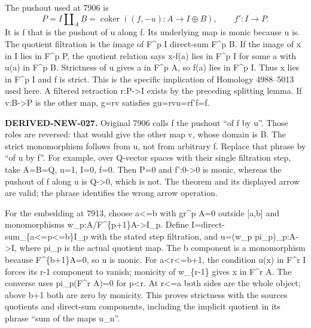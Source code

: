 The pushout used at 7906 is \[
 P=I\amalg_A B
   =\operatorname{coker}((f,-u):A\to I\oplus B),\qquad
 f':I\longrightarrow P.                                      \tag{3.1}
\] It is f\textquotesingle{} that is the pushout of u along f. Its underlying map is monic because u is. The quotient filtration is the image of F\^{}p I direct-sum F\^{}p B. If the image of x in I lies in F\^{}p P,\allowbreak{} the quotient relation says x-f(a)\allowbreak{} lies in F\^{}p I for some a with u(a)\allowbreak{} in F\^{}p B. Strictness of u gives a in F\^{}p A,\allowbreak{} so f(a)\allowbreak{} lies in F\^{}p I. Thus x lies in F\^{}p I and f\textquotesingle{} is strict. This is the specific implication of Homology 4988–\allowbreak{}5013 used here. A filtered retraction r:\allowbreak{}P\allowbreak{}->I exists by the preceding splitting lemma. If v:\allowbreak{}B\allowbreak{}->P is the other map,\allowbreak{} g\allowbreak{}=rv satisfies gu\allowbreak{}=rvu\allowbreak{}=rf'f\allowbreak{}=f.

\textbf{DERIVED-NEW-027.} Original 7906 calls f\textquotesingle{} the pushout ``of f by u''. Those roles are reversed:\allowbreak{} that would give the other map v,\allowbreak{} whose domain is B. The strict monomorphism follows from u,\allowbreak{} not from arbitrary f. Replace that phrase by ``of u by f''. For example,\allowbreak{} over Q-vector spaces with their single filtration step,\allowbreak{} take A\allowbreak{}=B\allowbreak{}=Q,\allowbreak{} u\allowbreak{}=1,\allowbreak{} I\allowbreak{}=0,\allowbreak{} f\allowbreak{}=0. Then P\allowbreak{}=0 and f':\allowbreak{}0\allowbreak{}->0 is monic,\allowbreak{} whereas the pushout of f along u is Q\allowbreak{}->0,\allowbreak{} which is not. The theorem and its displayed arrow are valid; the phrase identifies the wrong arrow operation.

For the embedding at 7913,\allowbreak{} choose a<\allowbreak{}=b with gr\^{}p A\allowbreak{}=0 outside [a,\allowbreak{}b]\allowbreak{} and monomorphisms w\_\allowbreak{}p:\allowbreak{}A/\allowbreak{}F\textasciicircum{}\{p\allowbreak{}+1\}A\allowbreak{}->I\_\allowbreak{}p. Define I\allowbreak{}=direct-sum\_\allowbreak{}\{a<\allowbreak{}=p<\allowbreak{}=b\}I\_\allowbreak{}p with the stated step filtration,\allowbreak{} and u\allowbreak{}=(w\_\allowbreak{}p pi\_\allowbreak{}p)\allowbreak{}\_\allowbreak{}p:\allowbreak{}A\allowbreak{}->I,\allowbreak{} where pi\_\allowbreak{}p is the actual quotient map. The b component is a monomorphism because F\textasciicircum{}\{b\allowbreak{}+1\}A\allowbreak{}=0,\allowbreak{} so u is monic. For a<r<\allowbreak{}=b\allowbreak{}+1,\allowbreak{} the condition u(x)\allowbreak{} in F\^{}r I forces its r-1 component to vanish; monicity of w\_\allowbreak{}\{r-1\} gives x in F\^{}r A. The converse uses pi\_\allowbreak{}p(F\textasciicircum{}r A)\allowbreak{}\allowbreak{}=0 for p\textless r. At r<\allowbreak{}=a both sides are the whole object; above b\allowbreak{}+1 both are zero by monicity. This proves strictness with the source\textquotesingle s quotients and direct-sum components,\allowbreak{} including the implicit quotient in its phrase ``sum of the maps u\_\allowbreak{}n”.

